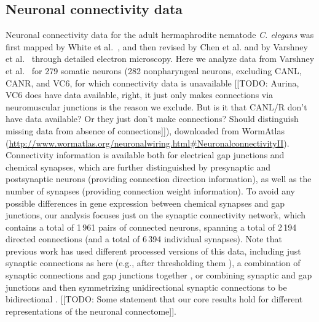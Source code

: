 \documentclass[10pt,letterpaper]{article}
\begin{document}


\subsection*{Neuronal connectivity data}
Neuronal connectivity data for the adult hermaphrodite nematode \emph{C. elegans} was first mapped by White et al.~\cite{White:1986tx}, and then revised by Chen et al. \cite{Chen:2006ie} and by Varshney et al.~\cite{Varshney2011} through detailed electron microscopy.
Here we analyze data from Varshney et al.~\cite{Varshney2011} for 279 somatic neurons (282 nonpharyngeal neurons, excluding CANL, CANR, and VC6, for which connectivity data is unavailable [[TODO: Aurina, VC6 does have data available, right, it just only makes connections via neuromuscular junctions is the reason we exclude. But is it that CANL/R don't have data available? Or they just don't make connections? Should distinguish missing data from absence of connections]]), downloaded from WormAtlas (\url{http://www.wormatlas.org/neuronalwiring.html#NeuronalconnectivityII}).
Connectivity information is available both for electrical gap junctions and chemical synapses, which are further distinguished by presynaptic and postsynaptic neurons (providing connection direction information), as well as the number of synapses (providing connection weight information).
To avoid any possible differences in gene expression between chemical synapses and gap junctions, our analysis focuses just on the synaptic connectivity network, which contains a total of 1\,961 pairs of connected neurons, spanning a total of 2\,194 directed connections (and a total of 6\,394 individual synapses).
Note that previous work has used different processed versions of this data, including just synaptic connections as here (e.g., after thresholding them \cite{Kashtan:2004ev}), a combination of synaptic connections and gap junctions together \cite{Azulay:2016cg, Kim:2016gl}, or combining synaptic and gap junctions and then symmetrizing unidirectional synaptic connections to be bidirectional \cite{Towlson:2013gf, Kim:2014bu, Pavlovic:2014gx}.
[[TODO: Some statement that our core results hold for different representations of the neuronal connectome]].
\end{document}
